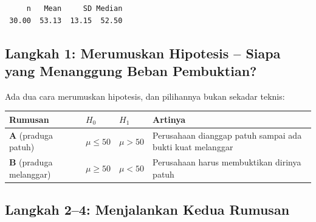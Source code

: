 \documentclass[
  indonesian,
  letterpaper,
]{book}
\newcounter{none} %
\begin{document}
\begin{verbatim}
     n   Mean     SD Median 
 30.00  53.13  13.15  52.50 
\end{verbatim}

\subsection{Langkah 1: Merumuskan Hipotesis -- Siapa yang Menanggung
Beban
Pembuktian?}\label{langkah-1-merumuskan-hipotesis-siapa-yang-menanggung-beban-pembuktian}

Ada dua cara merumuskan hipotesis, dan pilihannya bukan sekadar teknis:

{\def\LTcaptype{none} %
\begin{longtable}[]{@{}
  >{\raggedright\arraybackslash}p{}
  >{\raggedright\arraybackslash}p{}
  >{\raggedright\arraybackslash}p{}
  >{\raggedright\arraybackslash}p{}@{}}
\toprule\noalign{}
\begin{minipage}[b]{\linewidth}\raggedright
Rumusan
\end{minipage} & \begin{minipage}[b]{\linewidth}\raggedright
\(H_0\)
\end{minipage} & \begin{minipage}[b]{\linewidth}\raggedright
\(H_1\)
\end{minipage} & \begin{minipage}[b]{\linewidth}\raggedright
Artinya
\end{minipage} \\
\midrule\noalign{}
\endhead
\bottomrule\noalign{}
\endlastfoot
\textbf{A} (praduga patuh) & \(\mu \le 50\) & \(\mu > 50\) & Perusahaan
dianggap patuh sampai ada bukti kuat melanggar \\
\textbf{B} (praduga melanggar) & \(\mu \ge 50\) & \(\mu < 50\) &
Perusahaan harus membuktikan dirinya patuh \\
\end{longtable}
}

\subsection{Langkah 2--4: Menjalankan Kedua
Rumusan}\label{langkah-24-menjalankan-kedua-rumusan}
\end{document}
